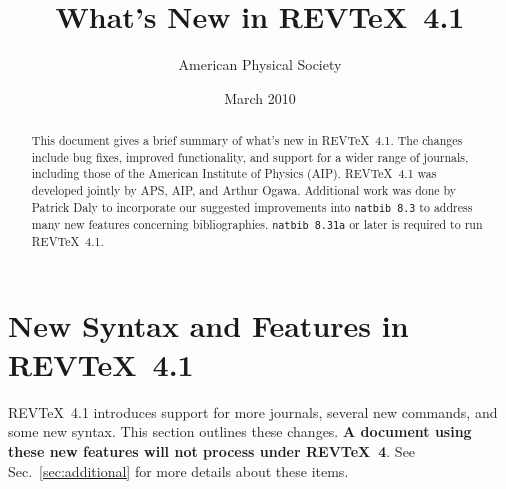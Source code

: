 \documentclass[%
,twocolumn%
,secnumarabic%
,amssymb,aps,pra,nobibnotes]{revtex4-1}
\DeclareRobustCommand\revtex{REV\TeX}
\begin{document}
\title{What's New in  \revtex~4.1}%
\author{American Physical Society}%
\date{March 2010}%


\begin{abstract}
This document gives a brief summary of what's new in  \revtex~4.1. The changes include bug fixes, improved functionality, and support for a wider range of journals, including those of the American Institute of Physics (AIP). \revtex~4.1 was developed jointly by APS, AIP, and Arthur Ogawa. Additional work was done by Patrick Daly to incorporate our suggested improvements into \texttt{natbib 8.3} to address many new features concerning bibliographies. \texttt{natbib 8.31a} or later is required to run \revtex~4.1.
\end{abstract}
\maketitle

\section{New Syntax and Features in \revtex~4.1}
\revtex~4.1 introduces support for more journals, several new commands, and some new syntax. This section outlines these changes. \textbf{A document using these new features will not process under \revtex~4}. See Sec.~\ref{sec:additional} for more details about these items.
\end{document}
